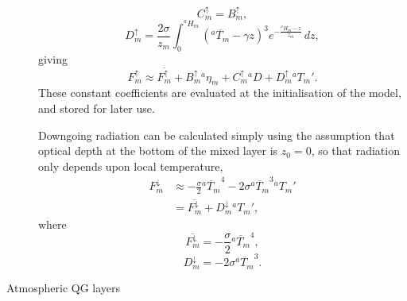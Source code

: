 \documentclass[11pt, a4paper,twoside]{article}
\newcommand{\etb}[2]{{{}^{#1}\eta_{#2}}}
\newcommand{\HH}[2]{{{}^{#1}H_{#2}}}
\newcommand{\T}[2]{{{}^{#1}T_{#2}}}
\newcommand{\bup}[1]{B^{\uparrow}_{#1}}
\newcommand{\cupp}[1]{C^{\uparrow}_{#1}}
\newcommand{\dup}[1]{D^{\uparrow}_{#1}}
\newcommand{\ddown}[1]{D^{\downarrow}_{#1}}
\newcommand{\Fup}[1]{{F^{\uparrow}_{#1}}}
\newcommand{\Fdown}[1]{{F^{\downarrow}_{#1}}}
\newcommand{\D}[1]{{}^{#1}D}
\numberwithin{equation}{section}
\begin{document}
\begin{description}
\begin{equation}
\end{equation}
\begin{equation}
 \cupp{m} =\bup{m},
\end{equation}
\begin{equation}
\dup{m} = \frac{ 2 \sigma }{ z_m } \int_0^{ \HH{a}{m} } \left( \overline{ \T{a}{m} } - \gamma z\right)^3 e^{-\frac{ \HH{a}{m} - z }{ z_m }} \,dz,
\end{equation}
giving
\begin{equation}
\Fup{m} \approx \overline{\Fup{m}} + \bup{m} \etb{a}{m} + \cupp{m} \D{a} + \dup{m} \T{a}{m}'.
\end{equation}
These constant coefficients are evaluated at the initialisation of the model, and stored for later use.

Downgoing radiation can be calculated simply using the assumption that optical depth at the bottom of the mixed layer is $z_0 = 0$, so that radiation only depends upon local temperature,
\begin{equation} \begin{split}
\Fdown{m} & \approx -\frac{\sigma }{2} \overline{ \T{a}{m} }^4 - 2 \sigma \overline{ \T{a}{m} }^3 \T{a}{m}' \\
& = \overline{\Fdown{m}} + \ddown{m}\T{a}{m}',
\end{split}\end{equation}
where
\begin{equation}
\overline{\Fdown{m}} = - \frac{\sigma}{2} \overline{ \T{a}{m} }^4,
\end{equation}
\begin{equation}
\ddown{m} = - 2\sigma \overline{ \T{a}{m} }^3.
\end{equation}

\item[Atmospheric QG layers]


\end{description}
\end{document}
